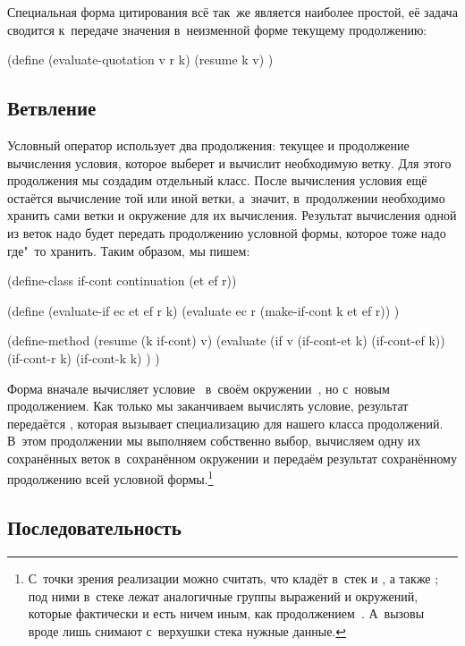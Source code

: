Специальная форма цитирования всё так~же является наиболее простой, её задача
сводится к~передаче значения в~неизменной форме текущему продолжению:

\begin{code:lisp}
(define (evaluate-quotation v r k)
  (resume k v) )
\end{code:lisp}


\subsection{Ветвление}\label{escape/actors/ssect:alternatives}

Условный оператор использует два продолжения: текущее и продолжение вычисления
условия, которое выберет и вычислит необходимую ветку. Для этого продолжения мы
создадим отдельный класс. После вычисления условия ещё остаётся вычисление той
или иной ветки, а~значит, в~продолжении необходимо хранить сами ветки и
окружение для их вычисления. Результат вычисления одной из веток надо будет
передать продолжению условной формы, которое тоже надо где"~то хранить. Таким
образом, мы пишем:

\begin{code:lisp}
(define-class if-cont continuation (et ef r))

(define (evaluate-if ec et ef r k)
  (evaluate ec r (make-if-cont k et ef r)) )

(define-method (resume (k if-cont) v)
  (evaluate (if v (if-cont-et k) (if-cont-ef k))
            (if-cont-r k)
            (if-cont-k k) ) )
\end{code:lisp}

Форма вначале вычисляет условие~ в~своём окружении~, но с~новым
продолжением. Как только мы заканчиваем вычислять условие, результат передаётся
, которая вызывает специализацию для нашего класса продолжений.
В~этом продолжении мы выполняем собственно выбор, вычисляем одну их сохранённых
веток в~сохранённом окружении и передаём результат сохранённому продолжению всей
условной формы.\footnote*{С~точки зрения реализации можно считать, что
 кладёт в~стек  и , а также ; под ними
в~стеке лежат аналогичные группы выражений и окружений, которые фактически и
есть ничем иным, как продолжением~. А~вызовы вроде 
лишь снимают с~верхушки стека нужные данные.}


\subsection{Последовательность}\label{escape/actors/ssect:sequence}

